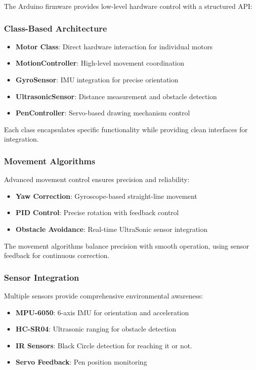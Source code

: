 The Arduino firmware provides low-level hardware control with a structured API:

\subsubsection{Class-Based Architecture}

\begin{itemize}
    \item \textbf{Motor Class}: Direct hardware interaction for individual motors
    \item \textbf{MotionController}: High-level movement coordination
    \item \textbf{GyroSensor}: IMU integration for precise orientation
    \item \textbf{UltrasonicSensor}: Distance measurement and obstacle detection
    \item \textbf{PenController}: Servo-based drawing mechanism control
\end{itemize}

Each class encapsulates specific functionality while providing clean interfaces for integration.

\subsubsection{Movement Algorithms}

Advanced movement control ensures precision and reliability:

\begin{itemize}
    \item \textbf{Yaw Correction}: Gyroscope-based straight-line movement
    \item \textbf{PID Control}: Precise rotation with feedback control
    \item \textbf{Obstacle Avoidance}: Real-time UltraSonic sensor integration
\end{itemize}

The movement algorithms balance precision with smooth operation, using sensor feedback for continuous correction.

\subsubsection{Sensor Integration}

Multiple sensors provide comprehensive environmental awareness:

\begin{itemize}
    \item \textbf{MPU-6050}: 6-axis IMU for orientation and acceleration
    \item \textbf{HC-SR04}: Ultrasonic ranging for obstacle detection
    \item \textbf{IR Sensors}: Black Circle detection for reaching it or not.
    \item \textbf{Servo Feedback}: Pen position monitoring
\end{itemize}

